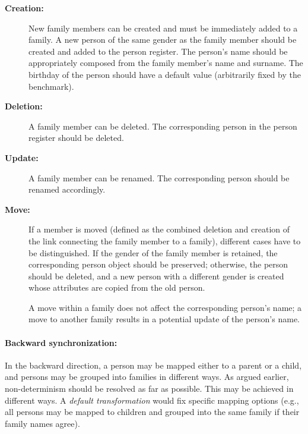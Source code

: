 \begin{description}
    \item[\textbf{Creation:}]
    New family members can be created and must be immediately added to a family.
    A new person of the same gender as the family member should be created and added to the person register.
    The person's name should be appropriately composed from the family member's name and surname.
    The birthday of the person should have a default value (arbitrarily fixed by the benchmark). 
    
    \item[\textbf{Deletion:}]
    A family member can be deleted.  The corresponding person in the person register should be deleted.
    
    \item[\textbf{Update:}]
    A family member can be renamed.  The corresponding person should be renamed accordingly.
    
    \item[\textbf{Move:}]
    If a member is moved (defined as the combined deletion and creation of the link connecting the family member to a family), different cases have to be distinguished.
    If the gender of the family member is retained, the corresponding person object should be preserved; otherwise, the person should be deleted, and a new person with a different gender is created whose attributes are copied from the old person. 
    
    A move within a family does not affect the corresponding person's name; a move to another family results in a potential update of the person's name.
\end{description}


\paragraph{Backward synchronization:}

In the backward direction, a person may be mapped either to a parent or a child, and persons may be grouped into families in different ways. As argued earlier, non-determinism should be resolved as far as possible. This may be achieved in different ways. A \emph{default transformation} would fix specific mapping options (e.g., all persons may be mapped to children and grouped into the same family if their family names agree). 

